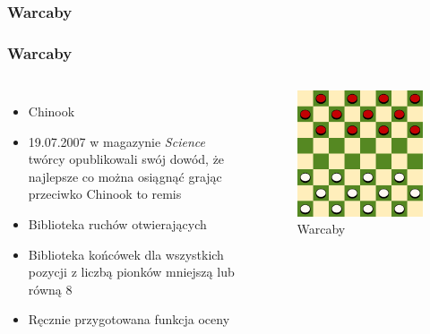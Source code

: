 \documentclass[polish,envcountsect,10pt]{beamer}
\begin{document}
            \subsubsection{Warcaby}
                \begin{frame}
                    \frametitle{Warcaby}
                    \begin{columns}
                        \begin{itemize}
                            \item<1-> Chinook
                            \item<2-> 19.07.2007 w magazynie \textit{Science} twórcy opublikowali swój dowód, że najlepsze co można osiągnąć grając przeciwko Chinook to remis
                            \item<3-> Biblioteka ruchów otwierających
                            \item<4-> Biblioteka końcówek dla wszystkich pozycji z liczbą pionków mniejszą lub równą 8
                            \item<5-> Ręcznie przygotowana funkcja oceny
                        \end{itemize}
                        \begin{figure}[H]
                            \centering
                            \includegraphics[width=\textwidth]{images/checkers}
                            \caption{Warcaby}
                        \end{figure}
                    \end{columns}
                \end{frame}
\end{document}
